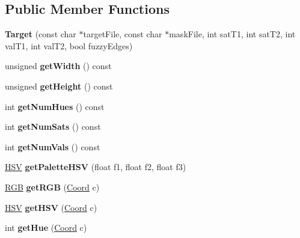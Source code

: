 \subsection*{Public Member Functions}
\begin{DoxyCompactItemize}
\item 
\hypertarget{classTarget_a229aad2bdd8cd6292f3934298a5f8bff}{}\label{classTarget_a229aad2bdd8cd6292f3934298a5f8bff} 
{\bfseries Target} (const char $\ast$target\+File, const char $\ast$mask\+File, int sat\+T1, int sat\+T2, int val\+T1, int val\+T2, bool fuzzy\+Edges)
\item 
\hypertarget{classTarget_ad48808c73e621c3d9b8bb5b8f53ad891}{}\label{classTarget_ad48808c73e621c3d9b8bb5b8f53ad891} 
unsigned {\bfseries get\+Width} () const
\item 
\hypertarget{classTarget_a95d7d3f5ba4706ba65677fa481588e1a}{}\label{classTarget_a95d7d3f5ba4706ba65677fa481588e1a} 
unsigned {\bfseries get\+Height} () const
\item 
\hypertarget{classTarget_a9c6d7c0bfabee74257aa8b5113725636}{}\label{classTarget_a9c6d7c0bfabee74257aa8b5113725636} 
int {\bfseries get\+Num\+Hues} () const
\item 
\hypertarget{classTarget_a6bc6d940d7fe3be268d9c611abca87ce}{}\label{classTarget_a6bc6d940d7fe3be268d9c611abca87ce} 
int {\bfseries get\+Num\+Sats} () const
\item 
\hypertarget{classTarget_a26e14ff80290839d29f6edfb9fe65ca4}{}\label{classTarget_a26e14ff80290839d29f6edfb9fe65ca4} 
int {\bfseries get\+Num\+Vals} () const
\item 
\hypertarget{classTarget_a176f3568bbccec8d9be3a86c4155fc39}{}\label{classTarget_a176f3568bbccec8d9be3a86c4155fc39} 
\hyperlink{structHSV}{H\+SV} {\bfseries get\+Palette\+H\+SV} (float f1, float f2, float f3)
\item 
\hypertarget{classTarget_af9bce9d96980ce3f11966ac00cf71654}{}\label{classTarget_af9bce9d96980ce3f11966ac00cf71654} 
\hyperlink{structRGB}{R\+GB} {\bfseries get\+R\+GB} (\hyperlink{structCoord}{Coord} c)
\item 
\hypertarget{classTarget_ab83ddbe10391f82878ea84c58d0ddba5}{}\label{classTarget_ab83ddbe10391f82878ea84c58d0ddba5} 
\hyperlink{structHSV}{H\+SV} {\bfseries get\+H\+SV} (\hyperlink{structCoord}{Coord} c)
\item 
\hypertarget{classTarget_aa60099653b874ad3efd5ba0e71cf591d}{}\label{classTarget_aa60099653b874ad3efd5ba0e71cf591d} 
int {\bfseries get\+Hue} (\hyperlink{structCoord}{Coord} c)
\item 

\end{DoxyCompactItemize}
